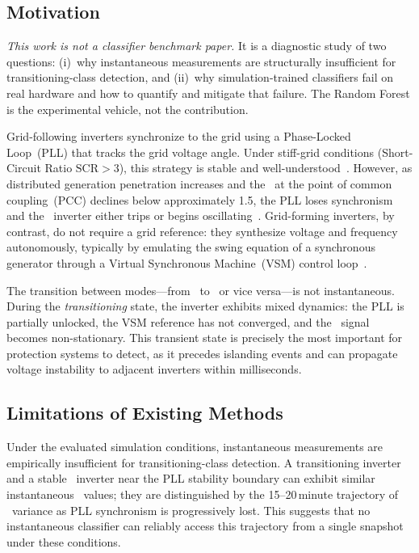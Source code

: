 \documentclass[journal]{IEEEtran}
\newcommand{\rocof}{\text{RoCoF}}
\newcommand{\scr}{\text{SCR}}
\newcommand{\gfl}{\text{GFL}}
\newcommand{\gfm}{\text{GFM}}
\begin{document}
\subsection{Motivation}

\emph{This work is not a classifier benchmark paper.}
It is a diagnostic study of two questions:
(i)~why instantaneous measurements are structurally insufficient for
transitioning-class detection, and
(ii)~why simulation-trained classifiers fail on real hardware and how
to quantify and mitigate that failure.
The Random Forest is the experimental vehicle, not the contribution.



Grid-following inverters synchronize to the grid using a
Phase-Locked Loop~(PLL) that tracks the grid voltage angle.
Under stiff-grid conditions (Short-Circuit Ratio $\scr > 3$),
this strategy is stable and well-understood~\cite{b_blaabjerg2006}.
However, as distributed generation penetration increases and the
\scr\ at the point of common coupling~(PCC) declines below approximately
1.5, the PLL loses synchronism and the \gfl\ inverter either trips or
begins oscillating~\cite{b_rocabert2012}.
Grid-forming inverters, by contrast, do not require a grid reference:
they synthesize voltage and frequency autonomously, typically by emulating
the swing equation of a synchronous generator through a Virtual Synchronous
Machine~(VSM) control loop~\cite{b_vsm_review,b_vinertia_review}.

The transition between modes---from \gfl\ to \gfm\ or vice versa---is
not instantaneous.
During the \emph{transitioning} state, the inverter exhibits mixed dynamics:
the PLL is partially unlocked, the VSM reference has not converged, and
the \rocof\ signal becomes non-stationary.
This transient state is precisely the most important for protection systems
to detect, as it precedes islanding events and can propagate voltage
instability to adjacent inverters within milliseconds.

\subsection{Limitations of Existing Methods}

Under the evaluated simulation conditions, instantaneous measurements
are empirically insufficient for transitioning-class detection.
A transitioning inverter and a stable \gfl\ inverter near the
PLL stability boundary can exhibit similar instantaneous \rocof\ values;
they are distinguished by the 15--20\,minute trajectory of
\rocof\ variance as PLL synchronism is progressively lost.
This suggests that no instantaneous classifier can reliably access
this trajectory from a single snapshot under these conditions.
\end{document}
